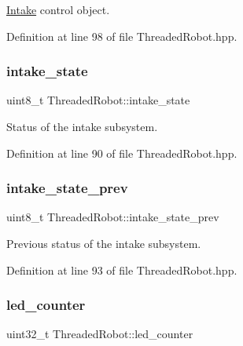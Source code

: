 \hyperlink{class_intake}{Intake} control object. 



Definition at line 98 of file Threaded\+Robot.\+hpp.

\mbox{\label{class_threaded_robot_a832f25be64f45ff3297d3da9609a9391}} 
\subsubsection{\texorpdfstring{intake\+\_\+state}{intake\_state}}
{\footnotesize\ttfamily uint8\+\_\+t Threaded\+Robot\+::intake\+\_\+state\hspace{0.3cm}{\ttfamily [private]}}



Status of the intake subsystem. 



Definition at line 90 of file Threaded\+Robot.\+hpp.

\mbox{\label{class_threaded_robot_a6ee4298a994be3756ea1821125ab9d57}} 
\subsubsection{\texorpdfstring{intake\+\_\+state\+\_\+prev}{intake\_state\_prev}}
{\footnotesize\ttfamily uint8\+\_\+t Threaded\+Robot\+::intake\+\_\+state\+\_\+prev\hspace{0.3cm}{\ttfamily [private]}}



Previous status of the intake subsystem. 



Definition at line 93 of file Threaded\+Robot.\+hpp.

\mbox{\label{class_threaded_robot_a857a1c5a3488176bd5a4bafc1b6d1d89}} 
\subsubsection{\texorpdfstring{led\+\_\+counter}{led\_counter}}
{\footnotesize\ttfamily uint32\+\_\+t Threaded\+Robot\+::led\+\_\+counter\hspace{0.3cm}{\ttfamily [private]}}




